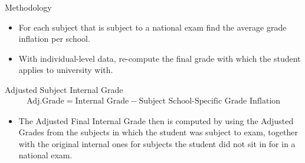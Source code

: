 \documentclass{beamer}
\begin{document}
\begin{frame}{Methodology}
    \begin{itemize}
    \item For each subject that is subject to a national exam find the average grade inflation per school.
    \item With individual-level data, re-compute the final grade with which the student applies to university with.
\end{itemize}


  \begin{block}{Adjusted Subject Internal Grade}
  \begin{align}
\text{Adj.Grade} = \text{Internal Grade} -\text{Subject School-Specific Grade Inflation}
  \end{align}
  \end{block}
  

\begin{itemize}
    \item The Adjusted Final Internal Grade then is computed by using the Adjusted Grades from the subjects in which the student was subject to exam, together with the original internal ones for subjects the student did not sit in for in a national exam.
\end{itemize}

\end{frame}
\end{document}
